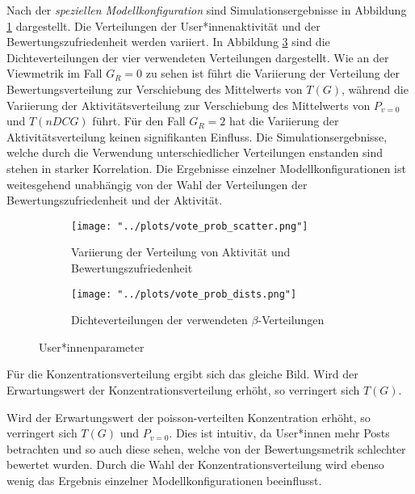 Nach der \textit{speziellen Modellkonfiguration} sind Simulationsergebnisse in Abbildung \ref{fig:user_params_a} dargestellt. Die Verteilungen der User*innenaktivität und der Bewertungszufriedenheit werden variiert. In Abbildung  \ref{fig:user_params_b} sind die Dichteverteilungen der vier verwendeten Verteilungen dargestellt. Wie an der Viewmetrik im Fall $G_R = 0$ zu sehen ist führt die Variierung der Verteilung der Bewertungsverteilung zur Verschiebung des Mittelwerts von $T(G)$, während die Variierung der Aktivitätsverteilung zur Verschiebung des Mittelwerts von $P_{v = 0}$ und $T(nDCG)$ führt. Für den Fall $G_R = 2$ hat die Variierung der Aktivitätsverteilung keinen signifikanten Einfluss. Die Simulationsergebnisse, welche durch die Verwendung unterschiedlicher Verteilungen enstanden sind stehen in starker Korrelation. Die Ergebnisse einzelner Modellkonfigurationen ist weitesgehend unabhängig von der Wahl der Verteilungen der Bewertungszufriedenheit und der Aktivität.

\begin{figure}[!h]
	\label{fig:user_params}	
	\begin{subfigure}{0.5\textwidth}
		\texttt{[image: "../plots/vote\_prob\_scatter.png"]}
		\caption{Variierung der Verteilung von Aktivität und Bewertungszufriedenheit}
		\label{fig:user_params_a}
	\end{subfigure}
	\begin{subfigure}{0.5\textwidth}
		\texttt{[image: "../plots/vote\_prob\_dists.png"]}
		\caption{Dichteverteilungen der verwendeten $\beta$-Verteilungen}
		\label{fig:user_params_b}
	\end{subfigure}
	\caption{User*innenparameter}
\end{figure}

Für die Konzentrationsverteilung ergibt sich das gleiche Bild. Wird der Erwartungswert der Konzentrationsverteilung erhöht, so verringert sich $T(G)$. 

Wird der Erwartungswert der poisson-verteilten Konzentration erhöht, so verringert sich $T(G)$ und $P_{v=0}$. Dies ist intuitiv, da User*innen mehr Posts betrachten und so auch diese sehen, welche von der Bewertungsmetrik schlechter bewertet wurden. Durch die Wahl der Konzentrationsverteilung wird ebenso wenig das Ergebnis einzelner Modellkonfigurationen beeinflusst.







